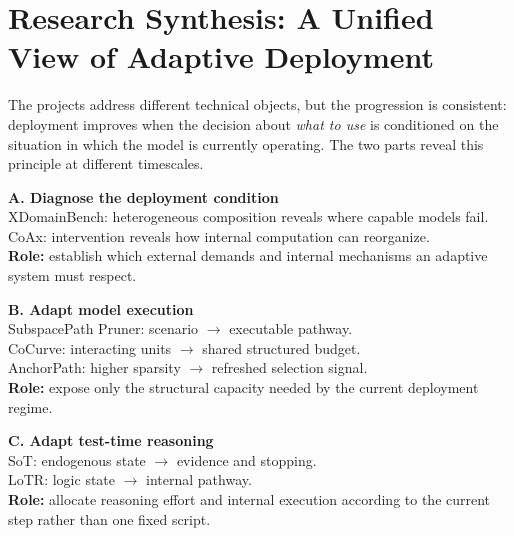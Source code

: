 \documentclass[12pt,a4paper]{article}
\newcommand{\method}[1]{{\sffamily\bfseries\color{MethodBlue}#1}}
\newcommand{\XDB}{\method{XDomainBench}}
\newcommand{\SubspacePath}{\method{SubspacePath Pruner}}
\newcommand{\CoCurve}{\method{CoCurve}}
\newcommand{\AnchorPath}{\method{AnchorPath}}
\newcommand{\CoAx}{\method{CoAx}}
\newcommand{\SoT}{\method{SoT}}
\newcommand{\LoTR}{\method{LoTR}}
\newcommand{\EtoE}{\method{E2E-Merge}}
\def\method#1{#1}\def\XDB{XDomainBench}\def\SubspacePath{SubspacePath Pruner}%
\def\CoCurve{CoCurve}\def\AnchorPath{AnchorPath}\def\CoAx{CoAx}%
\def\SoT{SoT}\def\LoTR{LoTR}\def\EtoE{E2E-Merge}%
\begin{document}
\clearpage
\section{Research Synthesis: A Unified View of Adaptive Deployment}
\label{sec:synthesis}

The projects address different technical objects, but the progression is consistent: deployment improves when the decision about \emph{what to use} is conditioned on the situation in which the model is currently operating. The two parts reveal this principle at different timescales.

\begin{tcbraster}[raster columns=3,raster equal height=rows,raster column skip=5pt]
\begin{tcolorbox}[colback=Purple!5,colframe=Purple!55,boxrule=.45pt,arc=1.5pt]\small{}\raggedright
\textbf{A. Diagnose the deployment condition}\\[-1mm]
\XDB{}: heterogeneous composition reveals where capable models fail.\\
\CoAx{}: intervention reveals how internal computation can reorganize.\\[1mm]
\small \textbf{Role:} establish which external demands and internal mechanisms an adaptive system must respect.
\end{tcolorbox}
\begin{tcolorbox}[colback=SoftBlue!52,colframe=NTUblue!55,boxrule=.45pt,arc=1.5pt]\small{}\raggedright
\textbf{B. Adapt model execution}\\[-1mm]
\SubspacePath{}: scenario $\rightarrow$ executable pathway.\\
\CoCurve{}: interacting units $\rightarrow$ shared structured budget.\\
\AnchorPath{}: higher sparsity $\rightarrow$ refreshed selection signal.\\[1mm]
\small \textbf{Role:} expose only the structural capacity needed by the current deployment regime.
\end{tcolorbox}
\begin{tcolorbox}[colback=SoftTeal!65,colframe=Teal!58,boxrule=.45pt,arc=1.5pt]\small{}\raggedright
\textbf{C. Adapt test-time reasoning}\\[-1mm]
\SoT{}: endogenous state $\rightarrow$ evidence and stopping.\\
\LoTR{}: logic state $\rightarrow$ internal pathway.\\[1mm]
\small \textbf{Role:} allocate reasoning effort and internal execution according to the current step rather than one fixed script.
\end{tcolorbox}
\end{tcbraster}
\end{document}
